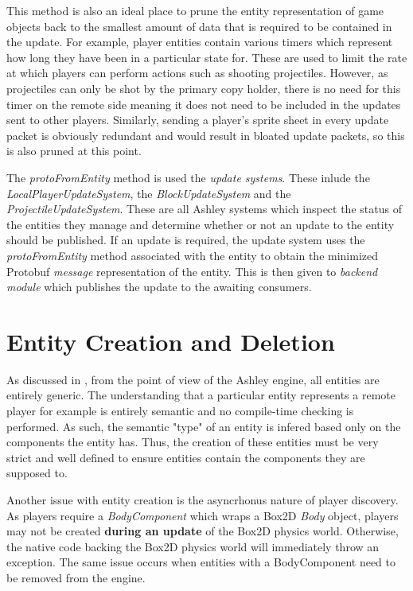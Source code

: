 This method is also an ideal place to prune the entity representation of game objects back to the smallest amount of data that is required to be contained in the update. For example, player entities contain various timers which represent how long they have been in a particular state for. These are used to limit the rate at which players can perform actions such as shooting projectiles. However, as projectiles can only be shot by the primary copy holder, there is no need for this timer on the remote side meaning it does not need to be included in the updates sent to other players. Similarly, sending a player's sprite sheet in every update packet is obviously redundant and would result in bloated update packets, so this is also pruned at this point.

The \textit{protoFromEntity} method is used the \textit{update systems}. These inlude the \textit{LocalPlayerUpdateSystem}, the \textit{BlockUpdateSystem} and the \textit{ProjectileUpdateSystem}. These are all Ashley systems which inspect the status of the entities they manage and determine whether or not an update to the entity should be published. If an update is required, the update system uses the \textit{protoFromEntity} method associated with the entity to obtain the minimized Protobuf \textit{message} representation of the entity. This is then given to \textit{backend module} which publishes the update to the awaiting consumers. 

\section{Entity Creation and Deletion}
As discussed in , from the point of view of the Ashley engine, all entities are entirely generic. The understanding that a particular entity represents a remote player for example is entirely semantic and no compile-time checking is performed. As such, the semantic "type" of an entity is infered based only on the components the entity has. Thus, the creation of these entities must be very strict and well defined to ensure entities contain the components they are supposed to. 

Another issue with entity creation is the asyncrhonus nature of player discovery. As players require a \textit{BodyComponent} which wraps a Box2D \textit{Body} object, players may not be created \textbf{during an update} of the Box2D physics world. Otherwise, the native code backing the Box2D physics world will immediately throw an exception. The same issue occurs when entities with a BodyComponent need to be removed from the engine.  

